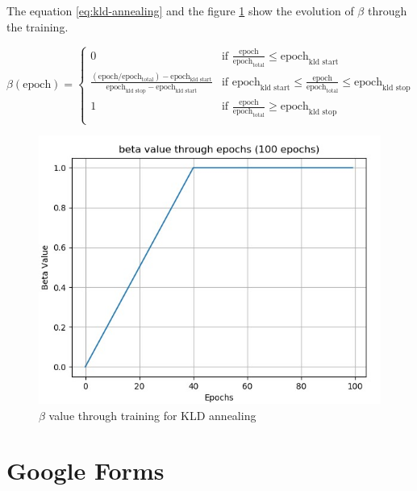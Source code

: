 \documentclass[12pt]{report}
\begin{document}
The equation \ref{eq:kld-annealing} and the figure \ref{fig:beta-annealing} show the evolution of $\beta$ through the training.

\begin{equation}
    \beta (\text{epoch}) =
    \begin{cases}
        0 & \text{if } \frac{\text{epoch}}{\text{epoch}_{\text{total}}} \leq \text{epoch}_{\text{kld start}} \\
        
        \frac{(\text{epoch} / \text{epoch}_{\text{total}}) - \text{epoch}_{\text{kld start}}}{\text{epoch}_{\text{kld stop}} - \text{epoch}_{\text{kld start}}} & \text{if } \text{epoch}_{\text{kld start}} \leq \frac{\text{epoch}}{\text{epoch}_{\text{total}}} \leq \text{epoch}_{\text{kld stop}} \\
        
        1 & \text{if } \frac{\text{epoch}}{\text{epoch}_{\text{total}}} \geq \text{epoch}_{\text{kld stop}} \\
    \end{cases}
    \label{eq:kld-annealing}
\end{equation}

\begin{figure}[htbp]
    \centering
    \includegraphics[width=0.8 \textwidth]{images/nn/training/beta-annealing.jpg}
    \caption{$\beta$ value through training for KLD annealing}
    \label{fig:beta-annealing}
\end{figure}


\section{Google Forms}
\label{appendix:google-forms}
\end{document}
